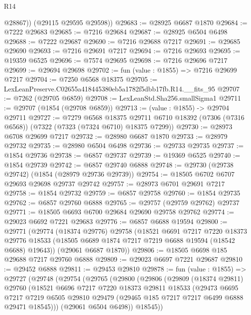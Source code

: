 \begin{lexlean}{R14}
\begin{coremodule}
          @28867))
      (@29115 @29595 @29598))
@29683 := @28925 @6687 @1870
@29684 := @7222 @29683
@29685 := @7216 @29684
@29687 := @28925 @6504 @6498
@29688 := @7222 @29687
@29690 := @7216 @29688 @7217
@29691 := @29685 @29690
@29693 := @7216 @29691 @7217
@29694 := @7216 @29693
@29695 := @19359 @6525
@29696 := @7574 @29695
@29698 := @7216 @29696 @7217
@29699 := @29694 @29698
@29702 := fun (value : @1855) => @7216 @29699 @7217
@29704 := @7250 @6568 @18375
@29705 := LexLeanPreserve.C02655a418445380eb5a1782f5dbb17fb.R14.__fits_95
@29707 := @7262 (@29705 @6859)
@29708 := LexLeanStd.Sha256.smallSigma1
@29711 := @29707 (@1854 (@29708 @6859))
@29713 := (value : @1855) -> @29704 @29711
@29727 := @7279
    @6568
    @18375
    @29711
    @6710
    @18392
    (@7306 (@7316 @6568))
    (@7322 (@7323 (@7324 @6710) @18375 @7299))
@29730 := @28973 @6708 @29699 @7217
@29732 := @28980 @6687 @1870
@29733 := @28979 @29732
@29735 := @28980 @6504 @6498
@29736 := @29733 @29735
@29737 := @1854 @29736
@29738 := @6857 @29737
@29739 := @19369 @6525
@29740 := @1854 @29739
@29742 := @6857 @29740 @6888
@29748 := @29730 (@29738 @29742) (@1854 (@28979 @29736 @29739))
@29754 := @18505 @6702 @6707 @29693 @29698 @29737 @29742
@29757 := @28973 @6701 @29691 @7217
@29758 := @1854 @29732
@29759 := @6857 @29758
@29760 := @1854 @29735
@29762 := @6857 @29760 @6888
@29765 := @29757 (@29759 @29762) @29737
@29771 := @18505 @6693 @6700 @29684 @29690 @29758 @29762
@29774 := @29023 @6692 @7221 @29683
@29776 := @6857 @6688 @19594
@29800 := @29771
    (@29774
      (@18374 @29776)
      @29758
      (@18521
        @6691
        @7217
        @7220
        @18373
        @29776
        @18533
        (@18505 @6689 @1874 @7217 @7219 @6688 @19594 (@18542 @6688) @19643))
      (@29061 @6687 @1870))
@29806 := @18505 @6698 @185 @29688 @7217 @29760 @6888
@29809 := @29023 @6697 @7221 @29687
@29810 := @29452 @6888
@29811 := @29453 @29810
@29878 := fun (value : @1855) =>
  @29727
    (@29748
      (@29754
        (@29765
          (@29800
            (@29806
              (@29809
                (@18374 @29811)
                @29760
                (@18521
                  @6696
                  @7217
                  @7220
                  @18373
                  @29811
                  @18533
                  (@29473
                    @6695
                    @7217
                    @7219
                    @6505
                    @29810
                    @29479
                    (@29465 @185 @7217 @7217 @6499 @6888 @29471 @18545)))
                (@29061 @6504 @6498))
              @18545))

\end{coremodule}
\end{lexlean}
